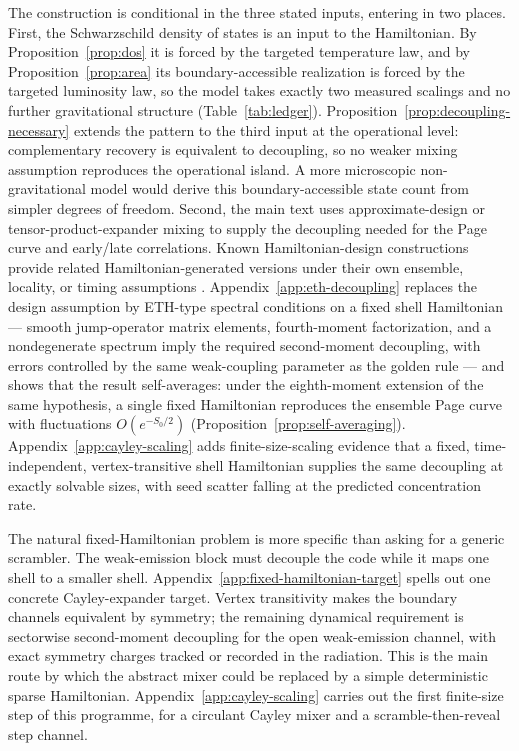 \documentclass[12pt]{article}
\begin{document}
The construction is conditional in the three stated inputs, entering in two
places.  First, the Schwarzschild
density of states is an input to the Hamiltonian.  By
Proposition~\ref{prop:dos} it is forced by the targeted temperature law, and
by Proposition~\ref{prop:area} its boundary-accessible realization is forced
by the targeted luminosity law, so the model takes exactly two measured
scalings and no further gravitational structure
(Table~\ref{tab:ledger}).  Proposition~\ref{prop:decoupling-necessary}
extends the pattern to the third input at the operational level:
complementary recovery is equivalent to decoupling, so no weaker mixing
assumption reproduces the operational island.  A more microscopic
non-gravitational model would derive this boundary-accessible state count from
simpler degrees of freedom.  Second, the main text uses approximate-design or
tensor-product-expander mixing to supply the decoupling
needed for the Page curve and early/late correlations.  Known
Hamiltonian-design constructions provide related Hamiltonian-generated
versions under their own ensemble, locality, or timing assumptions
\cite{NakataHircheKoashiWinter2017,CuiSchusterMaoHuangBrandao2025,
ZhouZhouSonner2026}.  Appendix~\ref{app:eth-decoupling} replaces the design
assumption by ETH-type spectral conditions on a fixed shell Hamiltonian ---
smooth jump-operator matrix elements, fourth-moment factorization, and a
nondegenerate spectrum imply the required second-moment decoupling, with
errors controlled by the same weak-coupling parameter as the golden rule ---
and shows that the result self-averages: under the eighth-moment extension
of the same hypothesis, a single fixed Hamiltonian reproduces the ensemble
Page curve with fluctuations $O(e^{-S_0/2})$
(Proposition~\ref{prop:self-averaging}).
Appendix~\ref{app:cayley-scaling} adds
finite-size-scaling evidence that a fixed, time-independent,
vertex-transitive shell Hamiltonian supplies the same decoupling at exactly
solvable sizes, with seed scatter falling at the predicted concentration
rate.

The natural fixed-Hamiltonian problem is more specific than asking for a
generic scrambler.  The weak-emission block must decouple the code while it
maps one shell to a smaller shell.  Appendix~\ref{app:fixed-hamiltonian-target}
spells out one concrete Cayley-expander target.  Vertex transitivity makes the
boundary channels equivalent by symmetry; the remaining dynamical requirement
is sectorwise second-moment decoupling for the open weak-emission channel,
with exact symmetry charges tracked or recorded in the radiation.  This is the
main route by which the abstract mixer could be replaced by a simple
deterministic sparse Hamiltonian.  Appendix~\ref{app:cayley-scaling} carries
out the first finite-size step of this programme, for a circulant Cayley
mixer and a scramble-then-reveal step channel.
\end{document}
